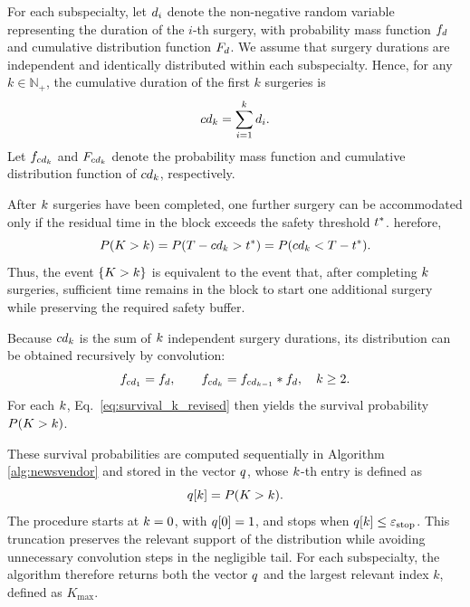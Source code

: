 For each subspecialty, let $d_i$ denote the non-negative random variable representing the duration of the $i$-th surgery, with probability mass function $f_{d}$ and cumulative distribution function $F_{d}$. 
We assume that surgery durations are independent and identically distributed within each subspecialty. Hence, for any $k \in \mathbb{N}_{+}$, the cumulative duration of the first $k$ surgeries is
\[
cd_{k}=\sum_{i=1}^{k}d_i.
\]
Let $f_{cd_{k}}$ and $F_{cd_{k}}$ denote the probability mass function and cumulative distribution function of $cd_{k}$, respectively.

After $k$ surgeries have been completed, one further surgery can be accommodated only if the residual time in the block exceeds the safety threshold $t^{*}$. 
herefore,
\begin{equation}\label{eq:survival_k_revised}
P(K > k)
=
P(T-cd_{k}>t^{*})
=
P(cd_{k}<T-t^{*}).
\end{equation}
Thus, the event $\{K > k\}$ is equivalent to the event that, after completing $k$ surgeries, sufficient time remains in the block to start one additional surgery while preserving the required safety buffer.

Because $cd_{k}$ is the sum of $k$ independent surgery durations, its distribution can be obtained recursively by convolution:
\[
f_{cd_{1}} = f_{d},
\qquad
f_{cd_{k}} = f_{cd_{k-1}} \ast f_{d},
\quad k \geq 2.
\]
For each $k$, Eq.~\eqref{eq:survival_k_revised} then yields the survival probability $P(K > k)$.

These survival probabilities are computed sequentially in Algorithm \ref{alg:newsvendor} and stored in the vector $q$, whose $k$-th entry is defined as
\[
q[k]=P(K > k).
\]
The procedure starts at $k=0$, with $q[0]=1$, and stops when $q[k]\leq \varepsilon_{\text{stop}}$. 
This truncation preserves the relevant support of the distribution while avoiding unnecessary convolution steps in the negligible tail. 
For each subspecialty, the algorithm therefore returns both the vector $q$ and the largest relevant index $k$, defined as $K_{\max}$.

